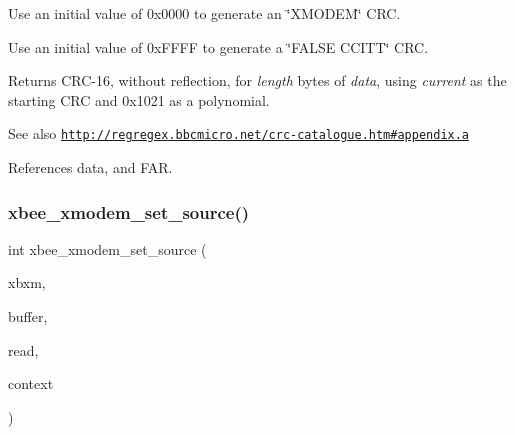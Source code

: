 \begin{DoxyItemize}
\item Use an initial value of 0x0000 to generate an \char`\"{}\+X\+M\+O\+D\+E\+M\char`\"{} C\+RC.
\item Use an initial value of 0x\+F\+F\+FF to generate a \char`\"{}\+F\+A\+L\+S\+E C\+C\+I\+T\+T\char`\"{} C\+RC.
\end{DoxyItemize}

\begin{DoxyReturn}{Returns}
C\+R\+C-\/16, without reflection, for {\itshape length} bytes of {\itshape data}, using {\itshape current} as the starting C\+RC and 0x1021 as a polynomial.
\end{DoxyReturn}
\begin{DoxySeeAlso}{See also}
\href{http://regregex.bbcmicro.net/crc-catalogue.htm#appendix.a}{\tt http\+://regregex.\+bbcmicro.\+net/crc-\/catalogue.\+htm\#appendix.\+a} 
\end{DoxySeeAlso}


References data, and F\+AR.

\mbox{\label{group__util__xmodem_gaa71f0823f6fc8db3f7c556819079b225}} 
\subsubsection{\texorpdfstring{xbee\+\_\+xmodem\+\_\+set\+\_\+source()}{xbee\_xmodem\_set\_source()}}
{\footnotesize\ttfamily int xbee\+\_\+xmodem\+\_\+set\+\_\+source (\begin{DoxyParamCaption}\item[{\hyperlink{structxbee__xmodem__state__t}{xbee\+\_\+xmodem\+\_\+state\+\_\+t} $\ast$}]{xbxm,  }\item[{void \hyperlink{group__hal_gaef060b3456fdcc093a7210a762d5f2ed}{F\+AR} $\ast$}]{buffer,  }\item[{\hyperlink{group__util__xmodem_ga25f49dbd4c2f9e274a32217a709d6382}{xbee\+\_\+xmodem\+\_\+read\+\_\+fn}}]{read,  }\item[{const void \hyperlink{group__hal_gaef060b3456fdcc093a7210a762d5f2ed}{F\+AR} $\ast$}]{context }\end{DoxyParamCaption})}



